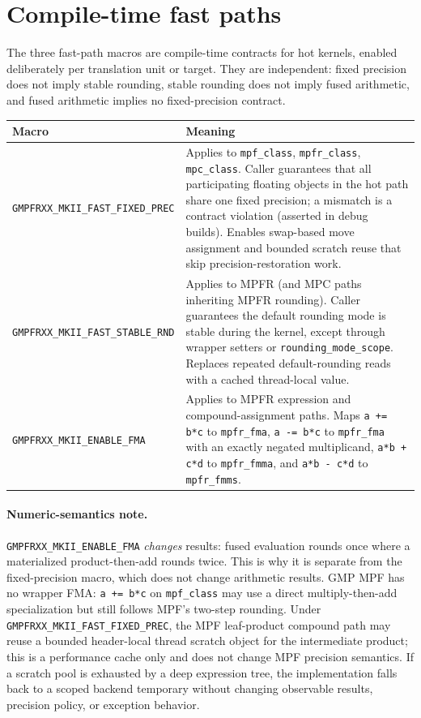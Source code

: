 \documentclass[11pt,a4paper]{article}
\newcommand{\code}[1]{\lstinline!#1!}
\begin{document}
\section{Compile-time fast paths}

The three fast-path macros are compile-time contracts for hot kernels, enabled
deliberately per translation unit or target. They are independent: fixed
precision does not imply stable rounding, stable rounding does not imply fused
arithmetic, and fused arithmetic implies no fixed-precision contract.

\begin{longtable}{@{}p{}p{}@{}}
\toprule
\textbf{Macro} & \textbf{Meaning} \\
\midrule
\endhead
\code{GMPFRXX_MKII_FAST_FIXED_PREC} &
Applies to \code{mpf_class}, \code{mpfr_class}, \code{mpc_class}. Caller
guarantees that all participating floating objects in the hot path share one
fixed precision; a mismatch is a contract violation (asserted in debug builds).
Enables swap-based move assignment and bounded scratch reuse that skip
precision-restoration work. \\[0.4em]
\code{GMPFRXX_MKII_FAST_STABLE_RND} &
Applies to MPFR (and MPC paths inheriting MPFR rounding). Caller guarantees the
default rounding mode is stable during the kernel, except through wrapper setters
or \code{rounding_mode_scope}. Replaces repeated default-rounding reads with a
cached thread-local value. \\[0.4em]
\code{GMPFRXX_MKII_ENABLE_FMA} &
Applies to MPFR expression and compound-assignment paths. Maps \code{a += b*c}
to \code{mpfr_fma}, \code{a -= b*c} to \code{mpfr_fma} with an exactly negated
multiplicand, \code{a*b + c*d} to \code{mpfr_fmma}, and \code{a*b - c*d} to
\code{mpfr_fmms}. \\
\bottomrule
\end{longtable}

\paragraph{Numeric-semantics note.}
\code{GMPFRXX_MKII_ENABLE_FMA} \emph{changes} results: fused evaluation rounds
once where a materialized product-then-add rounds twice. This is why it is
separate from the fixed-precision macro, which does not change arithmetic
results. GMP MPF has no wrapper FMA: \code{a += b*c} on \code{mpf_class} may use a
direct multiply-then-add specialization but still follows MPF's two-step
rounding. Under \code{GMPFRXX_MKII_FAST_FIXED_PREC}, the MPF leaf-product
compound path may reuse a bounded header-local thread scratch object for the
intermediate product; this is a performance cache only and does not change MPF
precision semantics. If a scratch pool is exhausted by a deep expression tree,
the implementation falls back to a scoped backend temporary without changing
observable results, precision policy, or exception behavior.
\end{document}
